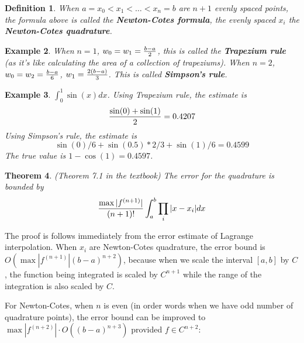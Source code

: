 \documentclass[20pt]{article} %
\theoremstyle{break}
\newtheorem{definition}{Definition}[section]
\newtheorem{exa}[definition]{Example}
\newtheorem{thm}[definition]{Theorem}
\begin{document}
\begin{definition} When $a=x_0<x_1<\dots<x_n=b$ are $n+1$ evenly spaced points, the formula above is called the {\bf Newton-Cotes formula}, the evenly spaced $x_i$ the {\bf Newton-Cotes quadrature}.
 \end{definition}

\begin{exa} When $n=1$, $w_0=w_1={b-a\over 2}$, this is called the {\bf Trapezium rule} (as it's like calculating the area of a collection of trapeziums). When $n=2$, $w_0=w_2={b-a\over 6}$, $w_1={2(b-a)\over 3}$. This is called {\bf Simpson's rule}.
\end{exa}

\begin{exa} $\int_0^1\sin(x)dx$. Using Trapezium rule, the estimate is
  \[{\sin(0)+\sin(1)\over 2}=0.4207\]
  Using Simpson's rule, the estimate is
  \[\sin(0)/6+\sin(0.5)*2/3+\sin(1)/6=0.4599\]
  The true value is $1-\cos(1)=0.4597$.
\end{exa}

\newpage

\begin{thm} \label{bound1}(Theorem 7.1 in the textbook)
The error for the quadrature is bounded by
\[{\max|f^{(n+1)}|\over (n+1)!}\int_a^b\prod_i|x-x_i| dx\]
\end{thm}

The proof is follows immediately from the error estimate of Lagrange interpolation. When $x_i$ are Newton-Cotes quadrature, the error bound is $O(\max|f^{(n+1)}|(b-a)^{n+2})$, because when we scale the interval $[a, b]$ by $C$, the function being integrated is scaled by $C^{n+1}$ while the range of the integration is also scaled by $C$.

\newpage

For Newton-Cotes, when $n$ is even (in order words when we have odd number of quadrature points), the error bound can be improved to $\max|f^{(n+2)}|\cdot O((b-a)^{n+3})$ provided $f\in C^{n+2}$:
\end{document}
